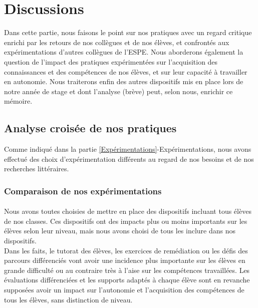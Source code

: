 \section{Discussions}
Dans cette partie, nous faisons le point sur nos pratiques avec un regard critique enrichi par les retours de nos collègues et de nos élèves, et confrontés aux expérimentations d'autres collègues de l'ESPE. Nous aborderons également la question de l'impact des pratiques expérimentées sur l'acquisition des connaissances et des compétences de nos élèves, et sur leur capacité à travailler en autonomie. Nous traiterons enfin des autres dispositifs mis en place lors de notre année de stage et dont l'analyse (brève) peut, selon nous, enrichir ce mémoire.
\subsection{Analyse croisée de nos pratiques}	
Comme indiqué dans la partie \ref{Expérimentations}-Expérimentations, nous avons effectué des choix d'expérimentation différents au regard de nos besoins et de nos recherches littéraires.\\
\subsubsection{Comparaison de nos expérimentations}
\paragraph*{}Nous avons toutes choisies de mettre en place des dispositifs incluant tous élèves de nos classes. Ces dispositifs ont des impacts plus ou moins importants sur les élèves selon leur niveau, mais nous avons choisi de tous les inclure dans nos dispositifs.\\
Dans les faits, le tutorat des élèves, les exercices de remédiation ou les défis des parcours différenciés vont avoir une incidence plus importante sur les élèves en grande difficulté ou au contraire très à l'aise sur les compétences travaillées. Les évaluations différenciées et les supports adaptés à chaque élève sont en revanche supposées avoir un impact sur l'autonomie et l'acquisition des compétences de tous les élèves, sans distinction de niveau.\\
